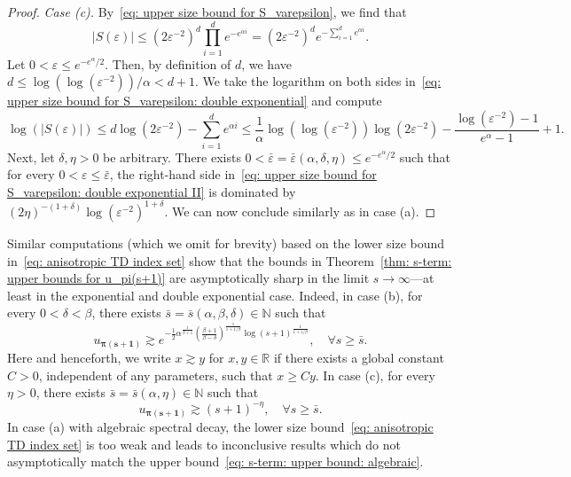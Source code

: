 \documentclass[namedate,webpdf]{ima-authoring-template-blank}
\newcommand{\abs}[1]{\left|#1\right|}
\numberwithin{counter}{section}
\numberwithin{equation}{section}
\theoremstyle{plain}
\theoremstyle{definition}
\newcommand*{\bbN}{\mathbb{N}}
\newcommand*{\bbR}{\mathbb{R}}
\theoremstyle{thmstyletwo}
\begin{document}
\begin{proof}
    \emph{Case (c).} By~\eqref{eq: upper size bound for S_varepsilon}, we find that
    \begin{equation}
    \label{eq: upper size bound for S_varepsilon: double exponential}
        \abs{S(\varepsilon)} \leq (2 \varepsilon^{-2})^d \prod_{i=1}^d e^{-e^{\alpha i}}
        = (2 \varepsilon^{-2})^d  e^{-\sum_{i=1}^d  e^{\alpha i}}.
    \end{equation}
    Let \(0 < \varepsilon \leq e^{-e^{\alpha} / 2}\). Then, by definition of \(d\), we have \(d \leq \log(\log( \varepsilon^{-2})) / \alpha < d + 1\). We take the logarithm on both sides in~\eqref{eq: upper size bound for S_varepsilon: double exponential} and compute
    \begin{equation}
    \label{eq: upper size bound for S_varepsilon: double exponential II}
        \log(\abs{S(\varepsilon)}) 
        \leq d \log(2 \varepsilon^{-2}) - \sum_{i=1}^d e^{\alpha i} 
        \leq \frac{1}{\alpha} \log(\log(\varepsilon^{-2})) \log(2\varepsilon^{-2}) - \frac{\log(\varepsilon^{-2}) - 1}{e^{\alpha} - 1}  + 1.
    \end{equation}
    Next, let \(\delta,\eta > 0\) be arbitrary. There exists \(0 < \bar{\varepsilon} = \bar{\varepsilon}(\alpha, \delta, \eta) \leq e^{-e^{\alpha} / 2}\) such that for every \(0 < \varepsilon \leq \bar{\varepsilon}\), the right-hand side in~\eqref{eq: upper size bound for S_varepsilon: double exponential II} is dominated by \((2 \eta)^{-(1 + \delta)} \log(\varepsilon^{-2})^{1+\delta}\). We can now conclude similarly as in case (a).
\end{proof}

Similar computations (which we omit for brevity) based on the lower size bound in~\eqref{eq: anisotropic TD index set} show that the bounds in Theorem~\ref{thm: s-term: upper bounds for u_pi(s+1)} are asymptotically sharp in the limit \(s \to \infty\)---at least in the exponential and double exponential case. Indeed, in case (b), for every \(0 < \delta < \beta\), there exists \(\bar{s} = \bar{s}(\alpha, \beta, \delta) \in \bbN\) such that
\begin{equation}
\label{eq: s-term: upper bound: lower bound: exponential}
    u_{\bm{\pi(s + 1)}} \gtrsim e^{- \frac{1}{2} \alpha^{\frac{1}{\beta + 1}} \left( \frac{\beta + 1}{\beta - \delta} \right)^{\frac{1}{1 + 1/\beta}} \log(s+1)^{\frac{1}{1 + 1/\beta}}},
    \quad \forall s \geq \bar{s}.
\end{equation}
Here and henceforth, we write \(x \gtrsim y\) for \(x, y \in \bbR\) if there exists a global constant \(C > 0\), independent of any parameters, such that \(x \geq C y\).
In case (c), for every \(\eta > 0\), there exists \(\bar{s} = \bar{s}(\alpha,\eta) \in \bbN\) such that
\[
u_{\bm{\pi(s + 1)}} \gtrsim (s+1)^{-\eta},
\quad \forall s \geq \bar{s}.
\]
In case (a) with algebraic spectral decay, the lower size bound~\eqref{eq: anisotropic TD index set} is too weak and leads to inconclusive results which do not asymptotically match the upper bound~\eqref{eq: s-term: upper bound: algebraic}.
\end{document}
